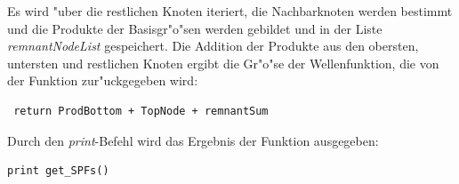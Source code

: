 Es wird "uber die restlichen Knoten iteriert, die Nachbarknoten werden bestimmt und die Produkte
der Basisgr"o"sen werden gebildet und in der Liste \textit{remnantNodeList} gespeichert.
Die Addition der Produkte aus den obersten, untersten und restlichen Knoten ergibt die
Gr"o"se der Wellenfunktion, die von der Funktion zur"uckgegeben wird: 

\begin{verbatim}
 return ProdBottom + TopNode + remnantSum
\end{verbatim}

Durch den \textit{print}-Befehl wird das Ergebnis der Funktion ausgegeben:

\begin{verbatim}
print get_SPFs()
\end{verbatim}
    
